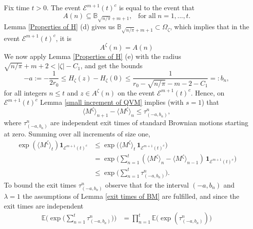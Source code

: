 \documentclass[11pt]{article}
\makeatletter
\renewenvironment{proof}[1][\proofname]{
   \par\pushQED{\qed}\normalfont
   \topsep6\p@\@plus6\p@\relax
   \trivlist\item[\hskip\labelsep\bfseries#1\@addpunct{.}]
   \ignorespaces
}{
   \popQED\endtrivlist\@endpefalse
}
\numberwithin{equation}{section}
\def\OZ{\Omega_{\zeta}}
\def\Ex{\mathbb{E}}
\makeatother
\begin{document}
\begin{proof}[Proof of Lemma \ref{no early points then smal QV}]
  Fix time $t > 0$.
  The event $\mathcal{E}^{m+1} (t)^c$ is equal to the event that 
  \begin{equation*}
    A(n) \subseteq \mathbb{B}_{\sqrt{n/ \pi} + m + 1},\;\;\;
    \text{for all}\; n= 1,...,t.
  \end{equation*}
  Lemma \ref{Properties of H} (d) gives us
  $\mathbb{B}_{\sqrt{n/ \pi} + m + 1} \subset \OZ$, 
  which implies that in the event $\mathcal{E}^{m+1} (t)^c$, it is
  $$
    A^{\zeta}(n) = A(n)
  $$
  We now apply Lemma \ref{Properties of H} (e)
  with the radius  $\sqrt{n/\pi} + m +2 < |\zeta| - C_1$,
  and get the bounds
  $$
    -a := - \frac{1}{2r_0} \leq
    H_{\zeta}(z) - H_{\zeta}(0) \leq
    \frac{1}{r_0 - \sqrt{n/\pi} - m -2 - C_1}
    =: b_n,
  $$
  for all integers $n \leq t$ and $z \in A^{\zeta}(n)$ 
  on the event $\mathcal{E}^{m+1} (t)^c$.
  Hence, on $\mathcal{E}^{m+1} (t)^c$ Lemma \ref{small increment of QVM} 
  implies (with $s=1$) that
  $$
    \langle M^{\zeta} \rangle _{n+1} 
    - \langle M^{\zeta} \rangle _{n}
    \leq \tau_{(-a, b_n)}^n,
  $$
  where $\tau^n_{(-a, b_n)}$ are independent exit times of 
  standard Brownian motions starting at zero. 
  Summing over all increments of size one,
  \begin{equation}\nonumber
    \begin{split}
      \exp (\langle M^{\zeta} \rangle _t) 
      \boldsymbol{1}_{\mathcal{E}^{m+1}(t)^c}
      & \leq 
      \exp \big( 
        \langle M^{\zeta} \rangle _t \, \boldsymbol{1}_{\mathcal{E}^{m+1}(t)^c}
        \big)\\
      & = \exp \Big(
            \sum_{n=1}^{t}
                (\langle M^{\zeta} \rangle _{n} - 
                  \langle M^{\zeta} \rangle_{n-1}) \,
            \boldsymbol{1}_{\mathcal{E}^{m+1}(t)^c} \Big)\\
      & \leq \exp \Big(
        \sum_{n=1}^{t} \tau^n_{(-a, b_n)} \Big).
    \end{split}
  \end{equation}
  To bound the exit times $\tau^n_{(-a, b_n)}$
  observe that for the interval $(-a, b_n)$ and 
  $\lambda = 1$ the assumptions of Lemma \ref{exit times of BM}
  are fulfilled, and since the exit times are independent
  \begin{equation} \nonumber
    \begin{split}
      \Ex \bigg( \exp \Big( \sum_{n=1}^{t} \tau^n_{(-a, b_n)} \Big) \bigg)
      & = \prod_{n=1}^{t} \Ex \big( \exp ( \tau^n_{(-a, b_n)}) \big)

\end{split}
\end{equation}
\end{proof}
\end{document}
